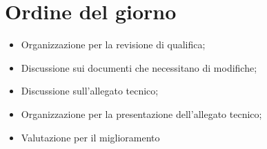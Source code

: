 \section{Ordine del giorno}
\begin{itemize}
\item Organizzazione per la revisione di qualifica;
\item Discussione sui documenti che necessitano di modifiche;
\item Discussione sull'allegato tecnico;
\item Organizzazione per la presentazione dell'allegato tecnico;
\item Valutazione per il miglioramento
\end{itemize}